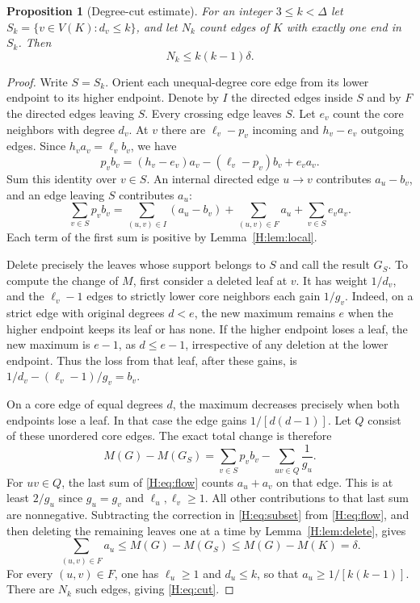 \documentclass[11pt,a4paper]{article}
\newtheorem{proposition}[theorem]{Proposition}
\theoremstyle{remark}\newtheorem{remark}[theorem]{Remark}
\numberwithin{equation}{section}
\begin{document}
\begin{proposition}[Degree-cut estimate]\label{H:prop:cut}
For an integer $3\le k<\Delta$ let $S_k=\{v\in V(K):d_v\le k\}$,
and let $N_k$ count edges of $K$ with exactly one end in $S_k$. Then
\begin{equation}\label{H:eq:cut}
 N_k\le k(k-1)\delta .
\end{equation}
\end{proposition}
\begin{proof}
Write $S=S_k$. Orient each unequal-degree core edge from its lower
endpoint to its higher endpoint. Denote by $I$ the directed edges
inside $S$ and by $F$ the directed edges leaving $S$. Every crossing
edge leaves $S$. Let $e_v$ count the core neighbors with degree $d_v$.
At $v$ there are $\ell_v-p_v$ incoming and $h_v-e_v$ outgoing edges.
Since $h_v a_v=\ell_v b_v$, we have
\[
 p_v b_v=(h_v-e_v)a_v-(\ell_v-p_v)b_v+e_v a_v .
\]
Sum this identity over $v\in S$. An internal directed edge $u\to v$
contributes $a_u-b_v$, and an edge leaving $S$ contributes $a_u$:
\begin{equation}\label{H:eq:flow}
 \sum_{v\in S}p_v b_v
 =\sum_{(u,v)\in I}(a_u-b_v)+\sum_{(u,v)\in F}a_u
        +\sum_{v\in S}e_v a_v .
\end{equation}
Each term of the first sum is positive by Lemma~\ref{H:lem:local}.

Delete precisely the leaves whose support belongs to $S$ and call the
result $G_S$. To compute the change of $M$, first consider a deleted
leaf at $v$. It has weight $1/d_v$, and the $\ell_v-1$ edges to
strictly lower core neighbors each gain $1/g_v$. Indeed, on a strict
edge with original degrees $d<e$, the new maximum remains $e$ when
the higher endpoint keeps its leaf or has none. If the higher endpoint
loses a leaf, the new maximum is $e-1$, as $d\le e-1$, irrespective
of any deletion at the lower endpoint. Thus the loss from that leaf,
after these gains, is $1/d_v-(\ell_v-1)/g_v=b_v$.

On a core edge of equal degrees $d$, the maximum decreases precisely
when both endpoints lose a leaf. In that case the edge gains
$1/[d(d-1)]$. Let $Q$ consist of these unordered core edges. The
exact total change is therefore
\begin{equation}\label{H:eq:subset}
 M(G)-M(G_S)=\sum_{v\in S}p_v b_v-\sum_{uv\in Q}\frac1{g_u}.
\end{equation}
For $uv\in Q$, the last sum of \eqref{H:eq:flow} counts $a_u+a_v$
on that edge. This is at least $2/g_u$ since $g_u=g_v$ and
$\ell_u,\ell_v\ge1$. All other contributions to that last sum are
nonnegative. Subtracting the correction in \eqref{H:eq:subset} from
\eqref{H:eq:flow}, and then deleting the remaining leaves one at a time
by Lemma~\ref{H:lem:delete}, gives
\[
 \sum_{(u,v)\in F}a_u\le M(G)-M(G_S)\le M(G)-M(K)=\delta .
\]
For every $(u,v)\in F$, one has $\ell_u\ge1$ and $d_u\le k$, so that
$a_u\ge1/[k(k-1)]$. There are $N_k$ such edges, giving \eqref{H:eq:cut}.
\end{proof}
\end{document}
